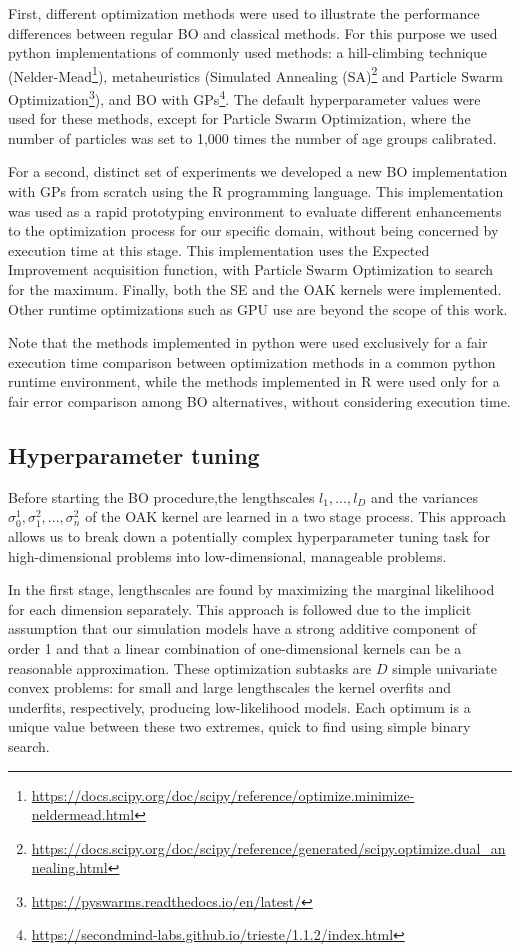 \documentclass{IOS-Book-Article}
\begin{document}
	First, different optimization methods were used to illustrate the performance differences between regular BO and classical methods. For this purpose we used python implementations of commonly used methods: a hill-climbing technique (Nelder-Mead\footnote{\url{https://docs.scipy.org/doc/scipy/reference/optimize.minimize-neldermead.html}}\cite{nelder-mead}), metaheuristics (Simulated Annealing (SA)\footnote{\url{https://docs.scipy.org/doc/scipy/reference/generated/scipy.optimize.dual_annealing.html}}\cite{simulated-annealing} and Particle Swarm Optimization\footnote{\url{https://pyswarms.readthedocs.io/en/latest/}}\cite{pso}), and BO with GPs\footnote{\url{https://secondmind-labs.github.io/trieste/1.1.2/index.html}}. The default hyperparameter values were used for these methods, except for Particle Swarm Optimization, where the number of particles was set to 1,000 times the number of age groups calibrated.
	
	For a second, distinct set of experiments we developed a new BO implementation with GPs from scratch using the R programming language. This implementation was used as a rapid prototyping environment to evaluate different enhancements to the optimization process for our specific domain, without being concerned by execution time at this stage. This implementation uses the Expected Improvement acquisition function, with Particle Swarm Optimization to search for the maximum. Finally, both the SE and the OAK kernels were implemented. Other runtime optimizations such as GPU use are beyond the scope of this work.

	Note that the methods implemented in python were used exclusively for a fair execution time comparison between optimization methods in a common python runtime environment, while the methods implemented in R were used only for a fair error comparison among BO alternatives, without considering execution time.
	
	\subsection{Hyperparameter tuning}

	Before starting the BO procedure,the lengthscales $l_1, ..., l_D$ and the variances $\sigma_0^1, \sigma_1^2, ..., \sigma_n^2$ of the OAK kernel are learned in a two stage process. This approach allows us to break down a potentially complex hyperparameter tuning task for high-dimensional problems into low-dimensional, manageable problems.

	In the first stage, lengthscales are found by maximizing the marginal likelihood for each dimension separately. This approach is followed due to the implicit assumption that our simulation models have a strong additive component of order 1 and that a linear combination of one-dimensional kernels can be a reasonable approximation. These optimization subtasks are $D$ simple univariate convex problems: for small and large lengthscales the kernel overfits and underfits, respectively, producing low-likelihood models. Each optimum is a unique value between these two extremes, quick to find using simple binary search.
	
\end{document}
